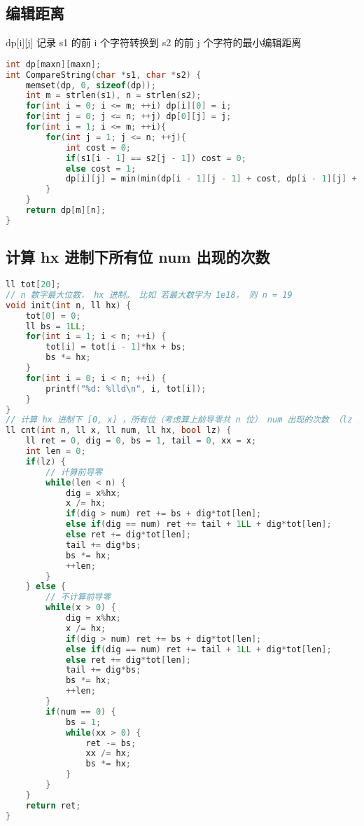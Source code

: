 \subsection{编辑距离}

dp[i][j] 记录 s1 的前 i 个字符转换到 s2 的前 j 个字符的最小编辑距离

\begin{lstlisting}[language=C++]
int dp[maxn][maxn];
int CompareString(char *s1, char *s2) {
    memset(dp, 0, sizeof(dp));
    int m = strlen(s1), n = strlen(s2);
    for(int i = 0; i <= m; ++i) dp[i][0] = i;
    for(int j = 0; j <= n; ++j) dp[0][j] = j;
    for(int i = 1; i <= m; ++i){
        for(int j = 1; j <= n; ++j){
            int cost = 0;
            if(s1[i - 1] == s2[j - 1]) cost = 0;
            else cost = 1;
            dp[i][j] = min(min(dp[i - 1][j - 1] + cost, dp[i - 1][j] + 1), dp[i][j - 1] + 1);
        }
    }
    return dp[m][n];
}    
\end{lstlisting}

\subsection{计算 hx 进制下所有位 num 出现的次数}

\begin{lstlisting}[language=C++]
ll tot[20];
// n 数字最大位数， hx 进制。 比如 若最大数字为 1e18， 则 n = 19
void init(int n, ll hx) {
    tot[0] = 0;
    ll bs = 1LL;
    for(int i = 1; i < n; ++i) {
        tot[i] = tot[i - 1]*hx + bs;
        bs *= hx;
    }
    for(int i = 0; i < n; ++i) {
        printf("%d: %lld\n", i, tot[i]);
    }
}
// 计算 hx 进制下 [0, x] ，所有位（考虑算上前导零共 n 位） num 出现的次数 （lz 为是否考虑前导零）
ll cnt(int n, ll x, ll num, ll hx, bool lz) {
    ll ret = 0, dig = 0, bs = 1, tail = 0, xx = x;
    int len = 0;
    if(lz) {
        // 计算前导零
        while(len < n) {
            dig = x%hx;
            x /= hx;
            if(dig > num) ret += bs + dig*tot[len];
            else if(dig == num) ret += tail + 1LL + dig*tot[len];
            else ret += dig*tot[len];
            tail += dig*bs;
            bs *= hx;
            ++len;
        }
    } else {
        // 不计算前导零
        while(x > 0) {
            dig = x%hx;
            x /= hx;
            if(dig > num) ret += bs + dig*tot[len];
            else if(dig == num) ret += tail + 1LL + dig*tot[len];
            else ret += dig*tot[len];
            tail += dig*bs;
            bs *= hx;
            ++len;
        }
        if(num == 0) {
            bs = 1;
            while(xx > 0) {
                ret -= bs;
                xx /= hx;
                bs *= hx;
            }
        }
    }
    return ret;
} 
\end{lstlisting}

